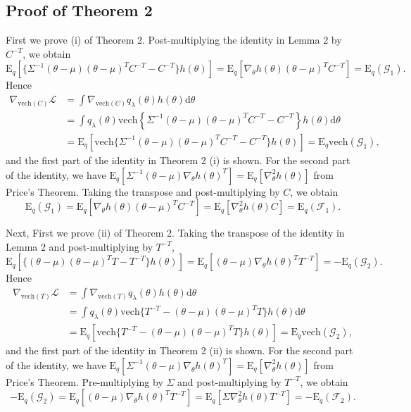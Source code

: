 \documentclass{statsoc}
\newcommand\df{{\text{d}}}
\newcommand\E{{\text{E}}}
\newcommand\mL{{\mathcal{L}}}
\newcommand\G{{\mathcal{G}}}
\newcommand\F{{\mathcal{F}}}
\newcommand{\vech}{\text{vech}}
\begin{document}
\subsection{Proof of Theorem 2}
First we prove (i) of Theorem 2. Post-multiplying the identity in Lemma 2 by $C^{-T}$, we obtain
\[
\E_q[\{\Sigma^{-1} (\theta-\mu)  (\theta - \mu) ^T C^{-T} - C^{-T}\}  h(\theta)] =  \E_q[ \nabla_\theta h(\theta)(\theta - \mu) ^T C^{-T}] = \E_q(\G_1).
\]
Hence
\[
\begin{aligned}
\nabla_{\vech(C)} \mL &= \int \nabla_{\vech(C)} q_\lambda (\theta)  h(\theta) \df \theta \\
& =  \int q_\lambda (\theta) \vech \left\{\Sigma^{-1}(\theta -\mu)(\theta-\mu)^TC^{-T} -  C^{-T} \right\} h(\theta) \df \theta \\
& = \E_q \left[ \vech \{\Sigma^{-1}(\theta -\mu)(\theta-\mu)^TC^{-T} -  C^{-T}\} h(\theta) \right] 
= \E_q \vech(\G_1),
\end{aligned}
\]
and the first part of the identity in Theorem 2 (i) is shown. For the second part of the identity, we have $\E_q[\Sigma^{-1} (\theta-\mu) \nabla_\theta h(\theta)^T]= \E_q[\nabla_\theta^2 h(\theta) ]$ from Price's Theorem. Taking the transpose and post-multiplying by $C$, we obtain 
\[
\E_q(\G_1) = \E_q[ \nabla_\theta h(\theta)  (\theta-\mu)^T C^{-T}]= \E_q[\nabla_\theta^2 h(\theta)C ] = \E_q(\F_1).
\]

Next, First we prove (ii) of Theorem 2. Taking the transpose of the identity in Lemma 2 and post-multiplying by $T^{-T}$,
\[
\E_q[\{ (\theta-\mu)  (\theta - \mu) ^T T - T^{-T}\}  h(\theta)] = \E_q[ (\theta - \mu) \nabla_\theta h(\theta)^T T^{-T}] = -\E_q(\G_2).
\] 
Hence
\[
\begin{aligned}
\nabla_{\vech(T)} \mL &= \int \nabla_{\vech(T)} q_\lambda (\theta)  h(\theta) \df \theta \\
& = \int q_\lambda (\theta) \vech \{T^{-T} -  (\theta-\mu)(\theta - \mu)^T T\}  h(\theta) \df \theta \\
& = \E_q[ \vech \{T^{-T} -  (\theta-\mu)(\theta - \mu)^T T\} h(\theta)] 
= \E_q \vech (\G_2) ,
\end{aligned}
\]
and the first part of the identity in Theorem 2 (ii) is shown. For the second part of the identity, we have $\E_q[\Sigma^{-1} (\theta-\mu) \nabla_\theta h(\theta)^T]= \E_q[\nabla_\theta^2 h(\theta) ]$ from Price's Theorem. Pre-multiplying by $\Sigma$ and post-multiplying by $T^{-T}$, we obtain 
\[
- \E_q (\G_2) = \E_q[(\theta-\mu) \nabla_\theta h(\theta)^TT^{-T}]= \E_q[\Sigma \nabla_\theta^2 h(\theta) T^{-T}] = - \E_q(\F_2).
\]
\end{document}
